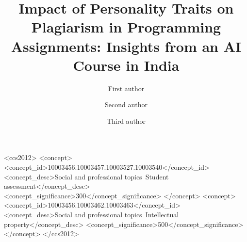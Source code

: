 \documentclass[manuscript,screen, sigconf,review ]{acmart}
\begin{document}
\title{Impact of Personality Traits on Plagiarism in Programming Assignments: Insights from an AI Course in India}

 

\author{First author}
\author{Second author}
\author{Third author}

\renewcommand{\shortauthors}{}

\begin{abstract}
    
\end{abstract}

\begin{CCSXML}
<ccs2012>
   <concept>
       <concept_id>10003456.10003457.10003527.10003540</concept_id>
       <concept_desc>Social and professional topics~Student assessment</concept_desc>
       <concept_significance>300</concept_significance>
       </concept>
   <concept>
       <concept_id>10003456.10003462.10003463</concept_id>
       <concept_desc>Social and professional topics~Intellectual property</concept_desc>
       <concept_significance>500</concept_significance>
       </concept>
 </ccs2012>
\end{CCSXML}
\end{document}
